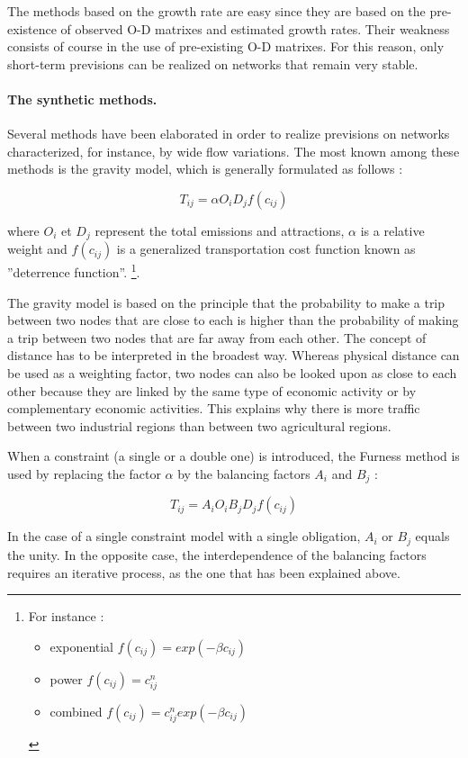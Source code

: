 The methods based on the growth rate are easy since they are based on the
pre-existence of observed O-D matrixes and estimated growth rates.  Their
weakness consists of course in the use of pre-existing O-D matrixes.  For this
reason, only short-term previsions can be realized on networks that remain very
stable.


\paragraph{The synthetic methods.}

Several methods have been elaborated in order to realize previsions on networks
characterized, for instance, by wide flow variations. The most known among these
methods is the gravity model, which is generally formulated as follows :


$$T_{ij} = \alpha O_iD_jf(c_{ij})$$


where $O_i$ et $D_j$ represent the total emissions and attractions, $\alpha$ is a relative weight and $f(c_{ij})$ is a generalized transportation cost function
known as ''deterrence function''.
\footnote{For instance :
\begin{itemize}
\item exponential $f(c_{ij}) = exp(-\beta c_{ij})$
\item power $f(c_{ij}) = c_{ij}^n$
\item combined $f(c_{ij}) = c_{ij}^nexp(-\beta c_{ij})$
\end{itemize} }.



The gravity model is based on the principle that the probability to make a trip between two nodes that are close to each is higher than the
probability of making a trip between two nodes that are far away from
each other.  The concept of distance has to be interpreted in the broadest way.
Whereas physical distance can be used as a weighting factor, two nodes can
also be looked upon as close to each other because they are linked by the same
type of economic activity or by complementary economic activities.  This
explains why there is more traffic between two industrial regions than between
two agricultural regions.

When a constraint (a single or a double one) is introduced, the
Furness method is used by replacing the factor $\alpha$ by the balancing factors $A_i$
and $B_j$ :


$$T_{ij}=A_iO_iB_jD_jf(c_{ij})$$

In the case of a single constraint model with a single obligation, $A_i$ or $B_j$ equals the
unity. In the opposite case, the interdependence of the balancing factors
requires an iterative process, as the one that has been explained above.


